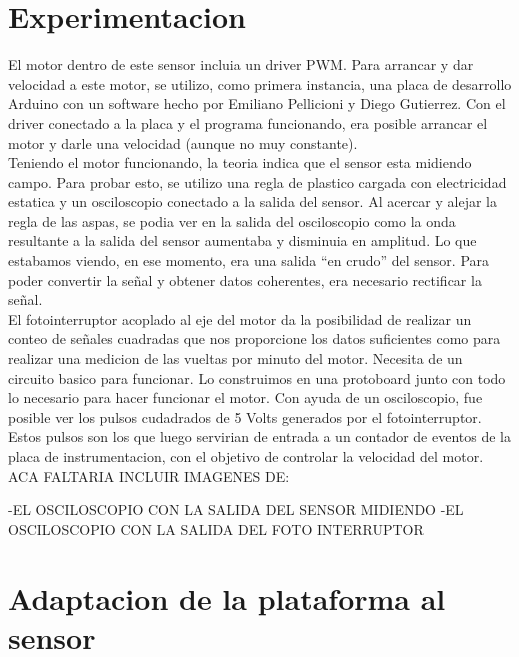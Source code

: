 
\section{Experimentacion} %
\label{it6:sec:experimentacion}

El motor dentro de este sensor incluia un driver PWM. Para arrancar y dar velocidad a este motor, se utilizo, como primera instancia, una placa de desarrollo Arduino con un software hecho por Emiliano Pellicioni y Diego Gutierrez. Con el driver conectado a la placa y el programa funcionando, era posible arrancar el motor y darle una velocidad (aunque no muy constante). \\

Teniendo el motor funcionando, la teoria indica que el sensor esta midiendo campo. Para probar esto, se utilizo una regla de plastico cargada con electricidad estatica y un osciloscopio conectado a la salida del sensor. Al acercar y alejar la regla de las aspas, se podia ver en la salida del osciloscopio como la onda resultante a la salida del sensor aumentaba y disminuia en amplitud. Lo que estabamos viendo, en ese momento, era una salida ``en crudo'' del sensor. Para poder convertir la señal y obtener datos coherentes, era necesario rectificar la señal. \\

El fotointerruptor acoplado al eje del motor da la posibilidad de realizar un conteo de señales cuadradas que nos proporcione los datos suficientes como para realizar una medicion de las vueltas por minuto del motor. Necesita de un circuito basico para funcionar. Lo construimos en una protoboard junto con todo lo necesario para hacer funcionar el motor. Con ayuda de un osciloscopio, fue posible ver los pulsos cudadrados de 5 Volts generados por el fotointerruptor. Estos pulsos son los que luego servirian de entrada a un contador de eventos de la placa de instrumentacion, con el objetivo de controlar la velocidad del motor. \\

ACA FALTARIA INCLUIR IMAGENES DE:

-EL OSCILOSCOPIO CON LA SALIDA DEL SENSOR MIDIENDO
-EL OSCILOSCOPIO CON LA SALIDA DEL FOTO INTERRUPTOR


\section{Adaptacion de la plataforma al sensor} %
\label{it6:sec:adaptacion_de_la_plataforma_al_sensor}

